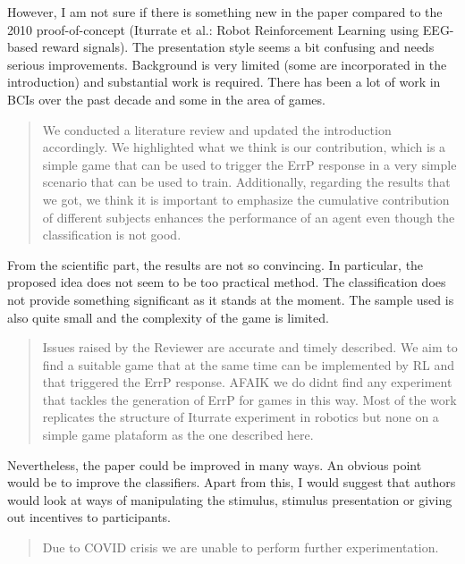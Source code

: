 \documentclass[journal,onecolumn,12pt]{IEEEtran}
\begin{document}
However, I am not sure if there is something new in the paper compared to the 2010 proof-of-concept (Iturrate et al.: Robot Reinforcement Learning using EEG-based reward signals). The presentation style seems a bit confusing and needs serious improvements. Background is very limited (some are incorporated in the introduction) and substantial work is required. There has been a lot of work in BCIs over the past decade and some in the area of games.

\begin{quotation}
{\color{blue}
We conducted a literature review and updated the introduction accordingly.  We highlighted what we think is our contribution, which is a simple game that can be used to trigger the ErrP response in a very simple scenario that can be used to train.  Additionally, regarding the results that we got, we think it is important to emphasize the cumulative contribution of different subjects enhances the performance of an agent even though the classification is not good.
}
\end{quotation}


From the scientific part, the results are not so convincing. In particular, the proposed idea does not seem to be too practical method. The classification does not provide something significant as it stands at the moment. The sample used is also quite small and the complexity of the game is limited.

\begin{quotation}
{\color{blue}
Issues raised by the Reviewer are accurate and timely described.  We aim to find a suitable game that at the same time can be implemented by RL and that triggered the ErrP response.  AFAIK we do didnt find any experiment that tackles the generation of ErrP for games in this way.  Most of the work replicates the structure of Iturrate experiment in robotics but none on a simple game plataform as the one described here.
}
\end{quotation}


Nevertheless, the paper could be improved in many ways. An obvious point would be to improve the classifiers. Apart from this, I would suggest that authors would look at ways of manipulating the stimulus, stimulus presentation or giving out incentives to participants.

\begin{quotation}
{\color{blue}
Due to COVID crisis we are unable to perform further experimentation.  
}
\end{quotation}
\end{document}
